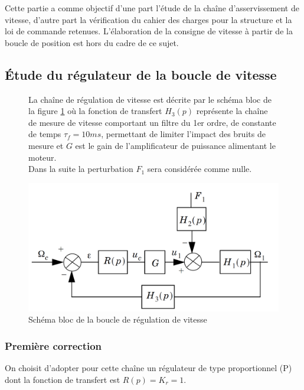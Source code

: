 Cette partie a comme objectif d'une part l'étude de la chaîne d'asservissement de
vitesse, d'autre part la vérification du cahier des charges pour la structure et la
loi de commande retenues. L'élaboration de la consigne de vitesse à partir de la
boucle de position est hors du cadre de ce sujet.

\subsection{Étude du régulateur de la boucle de vitesse}

\begin{figure}[!h]
\begin{minipage}{0.49\linewidth}
La chaîne de régulation de vitesse est décrite par le schéma bloc de la figure \ref{asserv2} où la fonction de transfert $H_3(p)$ représente la chaîne de mesure de vitesse comportant un filtre du 1er ordre, de constante de temps $\tau_f=10ms$, permettant de limiter l'impact des bruits de mesure et $G$ est le gain de l'amplificateur de puissance alimentant le moteur. \\
Dans la suite la perturbation $F_1$ sera considérée comme nulle.
\end{minipage}
\hfill
\begin{minipage}{0.49\linewidth}
 \centering\includegraphics[width=\linewidth]{img/asserv2}
 \caption{Schéma bloc de la boucle de régulation de vitesse}
 \label{asserv2}
 \end{minipage}
\end{figure}

\subsubsection{Première correction}

On choisit d'adopter pour cette chaîne un régulateur de type proportionnel (P) dont la fonction de transfert est $R(p)=K_r=1$.

